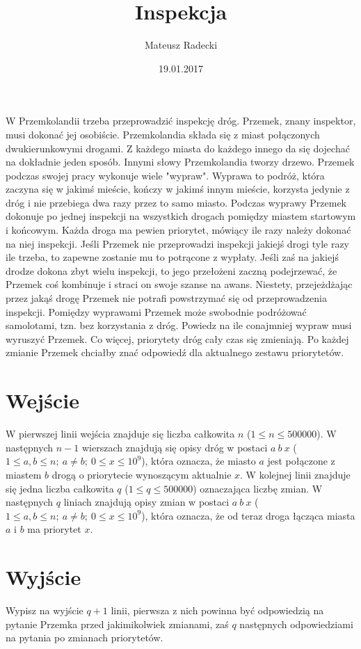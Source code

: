 \documentclass[zad,zawodnik,utf8]{sinol}
\title{Inspekcja}
\author{Mateusz Radecki} %
\date{19.01.2017}
\begin{document}
\begin{tasktext}%
    
    W Przemkolandii trzeba przeprowadzić inspekcję dróg. Przemek, znany inspektor, musi dokonać jej osobiście.
Przemkolandia składa się z miast połączonych dwukierunkowymi drogami. Z każdego miasta do każdego innego da się dojechać na dokładnie jeden sposób. Innymi słowy Przemkolandia tworzy drzewo.
\vskip 1mm
   Przemek podczas swojej pracy wykonuje wiele "wypraw". Wyprawa to podróż, która zaczyna się w jakimś mieście, kończy w jakimś innym mieście, korzysta jedynie z dróg i nie przebiega dwa razy przez to samo miasto.
\vskip 1mm
Podczas wyprawy Przemek dokonuje po jednej inspekcji na wszystkich drogach pomiędzy miastem startowym i końcowym. Każda droga ma pewien priorytet, mówiący ile razy należy dokonać na niej inspekcji. Jeśli Przemek nie przeprowadzi inspekcji jakiejś drogi tyle razy ile trzeba, to zapewne zostanie mu to potrącone z wypłaty. Jeśli zaś na jakiejś drodze dokona zbyt wielu inspekcji, to jego przełożeni zaczną podejrzewać, że Przemek coś kombinuje i straci on swoje szanse na awans. Niestety, przejeżdżając przez jakąś drogę Przemek nie potrafi powstrzymać się od przeprowadzenia inspekcji.
\vskip 1mm
Pomiędzy wyprawami Przemek może swobodnie podróżować samolotami, tzn. bez korzystania z dróg. Powiedz na ile conajmniej wypraw musi wyruszyć Przemek.
\vskip 1mm
Co więcej, priorytety dróg cały czas się zmieniają. Po każdej zmianie Przemek chciałby znać odpowiedź dla aktualnego zestawu priorytetów.


  \section{Wejście}

  W pierwszej linii wejścia znajduje się liczba całkowita $n$ ($1 \leq n \leq 500000$). W następnych $n-1$ wierszach znajdują się opisy dróg w postaci $a~b~x$ ($1 \leq a,b \leq n;~ a \neq b;~ 0 \leq x \leq 10^9$), która oznacza, że miasto $a$ jest połączone z miastem $b$ drogą o priorytecie wynoszącym aktualnie $x$.
\vskip 1mm
  W kolejnej linii znajduje się jedna liczba całkowita $q$ ($1 \leq q \leq 500000$) oznaczająca liczbę zmian. W następnych $q$ liniach znajdują opisy zmian w postaci $a~b~x$ ($1 \leq a,b \leq n;~ a \neq b;~ 0 \leq x \leq 10^9$), która oznacza, że od teraz droga łącząca miasta $a$ i $b$ ma priorytet $x$.

  \section{Wyjście}
   
   Wypisz na wyjście $q+1$ linii, pierwsza z nich powinna być odpowiedzią na pytanie Przemka przed jakimikolwiek zmianami, zaś $q$ następnych odpowiedziami na pytania po zmianach priorytetów.
  
\makecompactexample

\end{tasktext}
\end{document}

